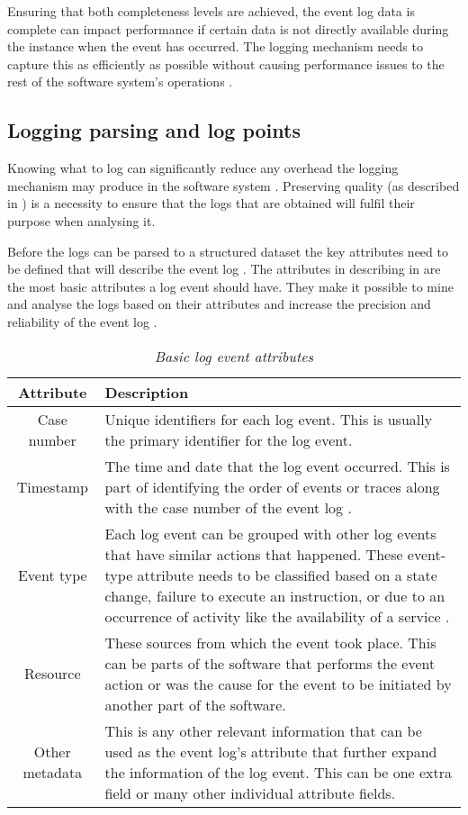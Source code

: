 Ensuring that both completeness levels are achieved, the event log data is complete can impact performance if certain data is not directly available during the instance when the event has occurred. The logging mechanism needs to capture this as efficiently as possible without causing performance issues to the rest of the software system's operations \cite{Zhu2015, Zhu2019}. 

\subsection{Logging parsing and log points}\label{sec:ch1_loggignPoints}
Knowing what to log can significantly reduce any overhead the logging mechanism may produce in the software system \cite{Jia2018, Pecchia2015}. Preserving quality (as described in ) is a necessity to ensure that the logs that are obtained will fulfil their purpose when analysing it.\par Before the logs can be parsed to a structured dataset the key attributes need to be defined that will describe the event log \cite{Bekeneva2020}. The attributes in describing in  are the most basic attributes a log event should have. They make it possible to mine and analyse the logs based on their attributes and increase the precision and reliability of the event log \cite{Kherbouche2017}.

\begin{table}[!htb]
	\centering
	\caption[Basic log event attributes]
	{\textit{Basic log event attributes \cite{Bekeneva2020}}}
	\label{tbl:ch1_logBasicAttributes}
	\begin{tabularx}{\textwidth}{|c|X|}
		\hline \textbf{Attribute} & \textbf{Description} \\
		\hline Case number & Unique identifiers for each log event. This is usually the primary identifier for the log event. \\
		\hline Timestamp & The time and date that the log event occurred. This is part of identifying the order of events or traces along with the case number of the event log \cite{Kherbouche2017}. \\
		\hline Event type & Each log event can be grouped with other log events that have similar actions that happened. These event-type attribute needs to be classified based on a state change, failure to execute an instruction, or due to an occurrence of activity like the availability of a service \cite{Fedaghi2010}. \\
		\hline Resource & These sources from which the event took place. This can be parts of the software that performs the event action or was the cause for the event to be initiated by another part of the software. \\
		\hline Other metadata & This is any other relevant information that can be used as the event log's attribute that further expand the information of the log event. This can be one extra field or many other individual attribute fields.\\
		\hline
	\end{tabularx}
\end{table}

